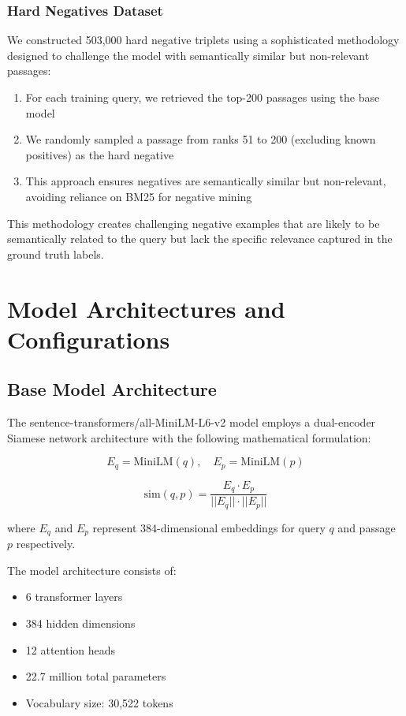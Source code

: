 \subsubsection{Hard Negatives Dataset}

We constructed 503,000 hard negative triplets using a sophisticated methodology designed to challenge the model with semantically similar but non-relevant passages:

\begin{enumerate}
\item For each training query, we retrieved the top-200 passages using the base model
\item We randomly sampled a passage from ranks 51 to 200 (excluding known positives) as the hard negative
\item This approach ensures negatives are semantically similar but non-relevant, avoiding reliance on BM25 \cite{robertson2009probabilistic} for negative mining
\end{enumerate}

This methodology creates challenging negative examples that are likely to be semantically related to the query but lack the specific relevance captured in the ground truth labels.

\section{Model Architectures and Configurations}

\subsection{Base Model Architecture}

The sentence-transformers/all-MiniLM-L6-v2 model employs a dual-encoder Siamese network architecture \cite{dong2022exploring} with the following mathematical formulation:

\begin{equation}
E_q = \text{MiniLM}(q), \quad E_p = \text{MiniLM}(p)
\end{equation}

\begin{equation}
\text{sim}(q,p) = \frac{E_q \cdot E_p}{||E_q|| \cdot ||E_p||}
\end{equation}

where $E_q$ and $E_p$ represent 384-dimensional embeddings for query $q$ and passage $p$ respectively.

The model architecture consists of:
\begin{itemize}
\item 6 transformer layers
\item 384 hidden dimensions  
\item 12 attention heads
\item 22.7 million total parameters
\item Vocabulary size: 30,522 tokens
\end{itemize}

